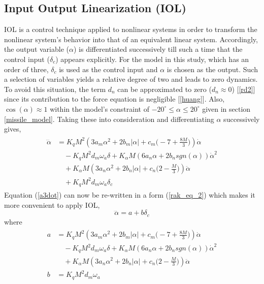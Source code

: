 \documentclass[conference]{IEEEtran}
\begin{document}
	\subsection{Input Output Linearization (IOL)}\label{AA}
		IOL is a control technique applied to nonlinear systems in order to transform the nonlinear system's behavior into that of an equivalent linear system.  Accordingly, the output variable ($\alpha$) is differentiated successively till such a time that the control input ($\delta_c$) appears explicitly. For the model in this study, which has an order of three, $\delta_c$ is used as the control input and $\alpha$ is chosen as the output. Such a selection of variables yields a relative degree of two and leads to zero dynamics. To avoid this situation, the term $d_n$ can be approximated to zero ($d_n \approx 0$) [\ref{rd2}] since its contribution to the force equation is negligible [\ref{huang}]. Also, $\cos(\alpha) \approx 1$ within the model's constraint of $-20^\circ \leq \alpha \leq 20^\circ$ given in section \ref{missile_model}. Taking these into consideration and differentiating $\alpha$ successively gives,
		\begin{eqnarray}
			\begin{aligned}
				\dddot{\alpha}&=K_q M^2(3a_m\alpha^2+2b_m|\alpha|+c_m\Big(-7+\frac{8M}{3}\Big))\dot{\alpha}\\ 
				&\quad - K_q M^2d_m\omega_a\delta+K_{\alpha}M(6a_n\alpha+2b_n sgn(\alpha))\dot{\alpha}^2\\ 
				&\quad + K_\alpha M(3a_n\alpha^2+2b_n|\alpha|+c_n\Big(2-\frac{M}{3}\Big))\ddot{\alpha}\\ 
				&\quad + K_q M^2d_m\omega_a\delta_c \label{a3dot}
			\end{aligned}
		\end{eqnarray}
		Equation (\ref{a3dot}) can now be re-written in a form (\ref{rak_eq_2}) which makes it more convenient to apply IOL,
		\begin{equation}
			\dddot{\alpha} = a + b\delta_c \label{rak_eq_2}
		\end{equation}
		where 
		\begin{eqnarray}
			\begin{aligned}
				a &= K_qM^2(3a_m\alpha^2+2b_m|\alpha|+c_m\Big(-7+\frac{8M}{3}\Big))\dot{\alpha} \\ 
				&\quad -K_qM^2d_m\omega_a\delta+K_\alpha M(6a_n\alpha+2b_nsgn(\alpha))\dot{\alpha}^2\\ 
				&\quad+K_\alpha M(3a_n\alpha^2+2b_n|\alpha|+c_n\Big(2-\frac{M}{3}\Big))\ddot{\alpha} \\
				b &= K_q M^2d_m\omega_a \nonumber
			\end{aligned}
		\end{eqnarray}
\end{document}

